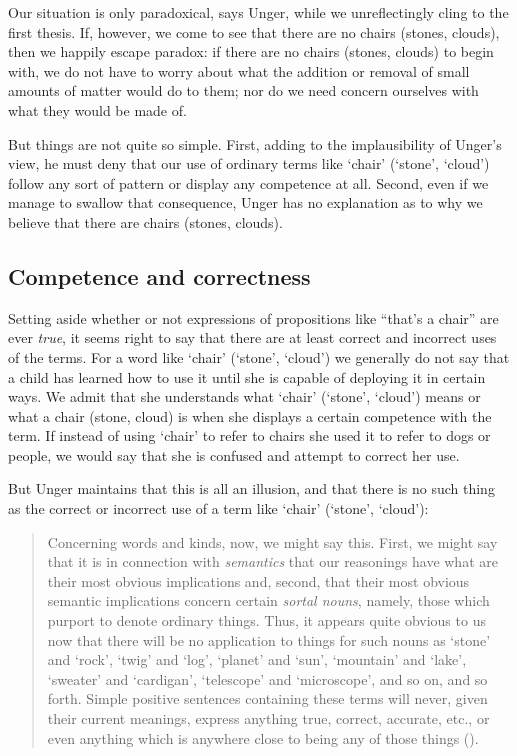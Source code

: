 \documentclass[11pt]{article}
\newenvironment{squote}{%
	\begin{quote}\begin{singlespace}%
	}{%
	\end{singlespace}\end{quote}}
\begin{document}
\begin{spacing}{1.5}
Our situation is only paradoxical, says Unger, while we unreflectingly
cling to the first thesis.  If, however, we come to see that there are
no chairs (stones, clouds), then we happily escape paradox: if there
are no chairs (stones, clouds) to begin with, we do not have to worry
about what the addition or removal of small amounts of matter would do
to them; nor do we need concern ourselves with what they would be made
of.

But things are not quite so simple.  First, adding to the
implausibility of Unger's view, he must deny that our use of ordinary
terms like `chair' (`stone', `cloud') follow any sort of pattern or
display any competence at all.  Second, even if we manage to swallow
that consequence, Unger has no explanation as to why we believe that
there are chairs (stones, clouds).

\subsection{Competence and correctness}
\label{comp}
Setting aside whether or not expressions of propositions like ``that's
a chair'' are ever \emph{true}, it seems right to say that there are
at least correct and incorrect uses of the terms.  For a word like
`chair' (`stone', `cloud') we generally do not say that a child has
learned how to use it until she is capable of deploying it in certain
ways.  We admit that she understands what `chair' (`stone', `cloud')
means or what a chair (stone, cloud) is when she displays a certain
competence with the term.  If instead of using `chair' to refer to
chairs she used it to refer to dogs or people, we would say that she
is confused and attempt to correct her use.

But Unger maintains that this is all an illusion, and that there is no
such thing as the correct or incorrect use of a term like `chair'
(`stone', `cloud'):

\begin{squote}
Concerning words and kinds, now, we might say this.  First, we might
say that it is in connection with \emph{semantics} that our reasonings have
what are their most obvious implications and, second, that their most
obvious semantic implications concern certain \emph{sortal nouns}, namely,
those which purport to denote ordinary things.  Thus, it appears quite
obvious to us now that there will be no application to things for such
nouns as `stone' and `rock', `twig' and `log', `planet' and `sun',
`mountain' and `lake', `sweater' and `cardigan', `telescope' and
`microscope', and so on, and so forth.  Simple positive sentences
containing these terms will never, given their current meanings,
express anything true, correct, accurate, etc., or even anything which
is anywhere close to being any of those things
(\citeyear[148]{unger1979}).
\end{squote}


\end{spacing}
\end{document}
